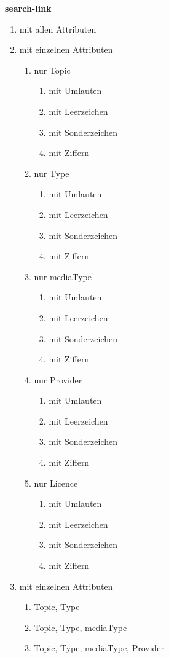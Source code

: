 \pagebreak

\flushleft \textbf{search-link}

\begin{enumerate}
  \item mit allen Attributen
  \item mit einzelnen Attributen

   \begin{enumerate}[label*=\arabic*.]
    \item nur Topic  
    \begin{enumerate}[label*=\arabic*.]
    \item mit Umlauten
    \item mit Leerzeichen
    \item mit Sonderzeichen
    \item mit Ziffern
\end{enumerate}
	\item nur Type
 	\begin{enumerate}[label*=\arabic*.]
    \item mit Umlauten
    \item mit Leerzeichen
    \item mit Sonderzeichen
    \item mit Ziffern
\end{enumerate}
	\item nur mediaType
	\begin{enumerate}[label*=\arabic*.]
    \item mit Umlauten
    \item mit Leerzeichen
    \item mit Sonderzeichen
    \item mit Ziffern
    \end{enumerate}
    \item nur Provider
	\begin{enumerate}[label*=\arabic*.]
    \item mit Umlauten
    \item mit Leerzeichen
    \item mit Sonderzeichen
    \item mit Ziffern
    \end{enumerate}
    \item nur Licence
	\begin{enumerate}[label*=\arabic*.]
    \item mit Umlauten
    \item mit Leerzeichen
    \item mit Sonderzeichen
    \item mit Ziffern
    \end{enumerate}
\end{enumerate}
\item mit einzelnen Attributen
\begin{enumerate}[label*=\arabic*.]
    \item Topic, Type
	\item Topic, Type, mediaType
	\item Topic, Type, mediaType, Provider
    \end{enumerate}
\end{enumerate}

